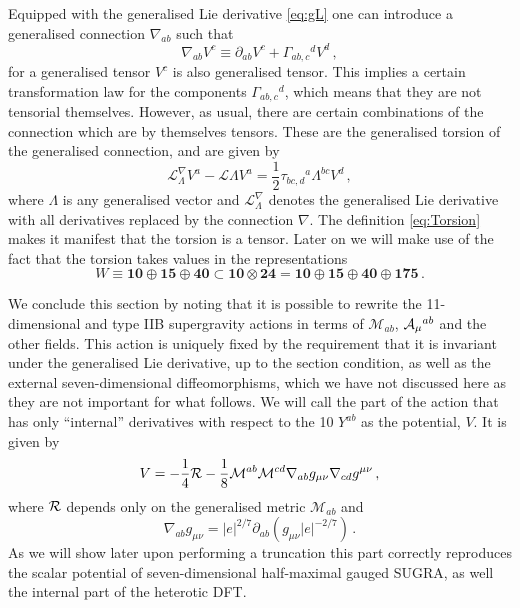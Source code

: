 \documentclass{PoS}
\newcommand{\TA}{{\cal A}}
\newcommand{\mbf}[1]{\mathbf{#1}}
\newcommand{\gL}{\mathcal{L}}
\newcommand{\gM}{\mathcal{M}}
\begin{document}
Equipped with the generalised Lie derivative \eqref{eq:gL} one can introduce a generalised connection $\nabla_{ab}$ such that
\begin{equation}
 \nabla_{ab} V^c \equiv \partial_{ab} V^c + \Gamma_{ab,c}{}^d V^d \,,
\end{equation}
for a generalised tensor $V^c$ is also generalised tensor. This implies a certain transformation law for the components $\Gamma_{ab,c}{}^d$, which means that they are not tensorial themselves. However, as usual, there are certain combinations of the connection which are by themselves tensors. These are the generalised torsion of the generalised connection, and are given by
\begin{equation}
 \gL_{\Lambda}^{\nabla} V^a - \gL \Lambda V^a = \frac12 \tau_{bc,d}{}^a \Lambda^{bc} V^d \,, \label{eq:Torsion}
\end{equation} 
where $\Lambda$ is any generalised vector and $\gL_{\Lambda}^\nabla$ denotes the generalised Lie derivative with all derivatives replaced by the connection $\nabla$. The definition \eqref{eq:Torsion} makes it manifest that the torsion is a tensor. Later on we will make use of the fact that the torsion takes values in the representations
\begin{equation}
 W \equiv \mbf{10} \oplus \mbf{15} \oplus \mbf{40} \subset \mbf{10} \otimes \mbf{24} = \mbf{10} \oplus \mbf{15} \oplus \mbf{40} \oplus \mbf{175} \,.
\end{equation}

We conclude this section by noting that it is possible to rewrite the 11-dimensional and type IIB supergravity actions in terms of $\gM_{ab}$, $\TA_\mu{}^{ab}$ and the other fields. This action is uniquely fixed by the requirement that it is invariant under the generalised Lie derivative, up to the section condition, as well as the external seven-dimensional diffeomorphisms, which we have not discussed here as they are not important for what follows. We will call the part of the action that has only ``internal'' derivatives with respect to the 10 $Y^{ab}$ as the potential, $V$. It is given by
\begin{equation}
 V = - \frac14 {\cal R} - \frac18 \gM^{ab} \gM^{cd} \nabla_{ab} g_{\mu\nu} \nabla_{cd} g^{\mu\nu} \,, \label{eq:EFTV}
\end{equation}
where ${\cal R}$ depends only on the generalised metric $\gM_{ab}$ and
\begin{equation}
 \nabla_{ab} g_{\mu\nu} = |e|^{2/7} \partial_{ab} \left( g_{\mu\nu} |e|^{-2/7} \right) \,.
\end{equation}
As we will show later upon performing a truncation this part correctly reproduces the scalar potential of seven-dimensional half-maximal gauged SUGRA, as well the internal part of the heterotic DFT.
\end{document}

